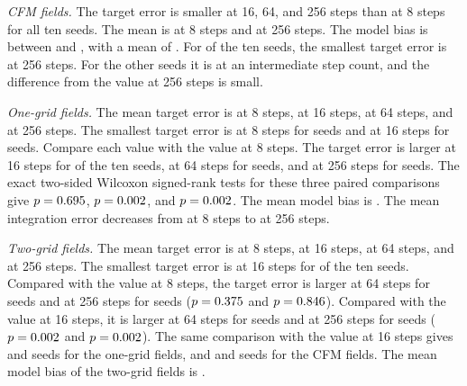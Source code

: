\emph{CFM fields.} The target error is smaller at 16, 64, and 256 steps
than at 8 steps for all ten seeds. The mean is \ScalarCfmEight{} at 8
steps and \ScalarCfmLarge{} at 256 steps. The model bias is between
\ScalarCfmBiasMin{} and \ScalarCfmBiasMax{}, with a mean of
\ScalarCfmBias{}. For \ScalarCfmArgminLast{} of the ten seeds, the
smallest target error is at 256 steps. For the other seeds it is at an
intermediate step count, and the difference from the value at 256 steps
is small.

\emph{One-grid fields.} The mean target error is \ScalarOneEight{} at 8
steps, \ScalarOneSixteen{} at 16 steps, \ScalarOneSixtyFour{} at 64
steps, and \ScalarOneLarge{} at 256 steps. The smallest target error is
at 8 steps for \ScalarOneArgminEight{} seeds and at 16 steps for
\ScalarOneArgminSixteen{} seeds. Compare each value with the value
at 8 steps. The target error is larger at 16 steps for
\ScalarOneIncreaseSixteen{} of the ten seeds, at 64 steps for
\ScalarOneIncreaseSixtyFour{} seeds, and at 256 steps for
\ScalarOneIncreaseLarge{} seeds. The exact two-sided
Wilcoxon signed-rank tests for these three paired comparisons give
$p=0.695$, $p=0.002$, and
$p=0.002$. The mean model bias is \ScalarOneBias{}.
The mean integration error decreases from \ScalarOneOwnEight{} at 8
steps to \ScalarOneOwnLarge{} at 256 steps.

\emph{Two-grid fields.} The mean target error is \ScalarTwoEight{} at 8
steps, \ScalarTwoSixteen{} at 16 steps, \ScalarTwoSixtyFour{} at 64
steps, and \ScalarTwoLarge{} at 256 steps. The smallest target error is
at 16 steps for \ScalarTwoArgminSixteen{} of the ten seeds. Compared
with the value at 8 steps, the target error is larger at 64 steps for
\ScalarTwoIncreaseSixtyFour{} seeds and at 256 steps for
\ScalarTwoIncreaseLarge{} seeds ($p=0.375$ and
$p=0.846$). Compared with the value at 16 steps, it
is larger at 64 steps for \ScalarTwoFromSixteenIncreaseSixtyFour{} seeds
and at 256 steps for \ScalarTwoFromSixteenIncreaseLarge{} seeds
($p=0.002$ and
$p=0.002$). The same comparison with the
value at 16 steps gives \ScalarOneFromSixteenIncreaseSixtyFour{} and
\ScalarOneFromSixteenIncreaseLarge{} seeds for the one-grid fields, and
\ScalarCfmFromSixteenIncreaseSixtyFour{} and
\ScalarCfmFromSixteenIncreaseLarge{} seeds for the CFM fields. The mean
model bias of the two-grid fields is \ScalarTwoBias{}.

